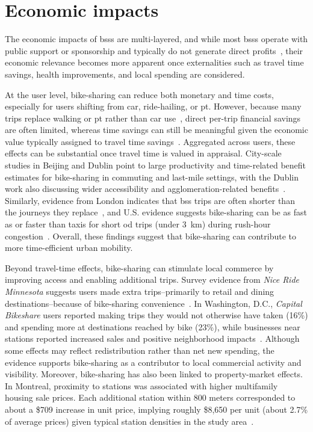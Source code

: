 \section{Economic impacts}

The economic impacts of \acp{bss} are multi-layered, and while most \acp{bss} operate with public support or sponsorship and typically do not generate direct profits~\cite{Luo2019}, their economic relevance becomes more apparent once externalities such as travel time savings, health improvements, and local spending are considered.

At the user level, bike-sharing can reduce both monetary and time costs, especially for users shifting from car, ride-hailing, or \ac{pt}. However, because many trips replace walking or \ac{pt} rather than car use~\cite{Murphy2015, Fishman2013, Fishman2014, BachandMarleau2012}, direct per-trip financial savings are often limited, whereas time savings can still be meaningful given the economic value typically assigned to travel time savings~\cite{Qiu2018}. Aggregated across users, these effects can be substantial once travel time is valued in appraisal. City-scale studies in Beijing and Dublin point to large productivity and time-related benefit estimates for bike-sharing in commuting and last-mile settings, with the Dublin work also discussing wider accessibility and agglomeration-related benefits~\cite{Qiu2018, Bullock2017}. Similarly, evidence from London indicates that \ac{bss} trips are often shorter than the journeys they replace~\cite{Woodcock2014}, and U.S. evidence suggests bike-sharing can be as fast as or faster than taxis for short \ac{od} trips (under 3~km) during rush-hour congestion~\cite{FaghihImani2017_Hail}. Overall, these findings suggest that bike-sharing can contribute to more time-efficient urban mobility.

Beyond travel-time effects, bike-sharing can stimulate local commerce by improving access and enabling additional trips. Survey evidence from \textit{Nice Ride Minnesota} suggests users made extra trips--primarily to retail and dining destinations--because of bike-sharing convenience~\cite{Schoner2012}. In Washington, D.C., \textit{Capital Bikeshare} users reported making trips they would not otherwise have taken (16\%) and spending more at destinations reached by bike (23\%), while businesses near stations reported increased sales and positive neighborhood impacts~\cite{Buehler2014}. Although some effects may reflect redistribution rather than net new spending, the evidence supports bike-sharing as a contributor to local commercial activity and visibility. Moreover, bike-sharing has also been linked to property-market effects. In Montreal, proximity to stations was associated with higher multifamily housing sale prices. Each additional station within 800 meters corresponded to about a \$709 increase in unit price, implying roughly \$8,650 per unit (about 2.7\% of average prices) given typical station densities in the study area~\cite{ElGeneidy2016}.

